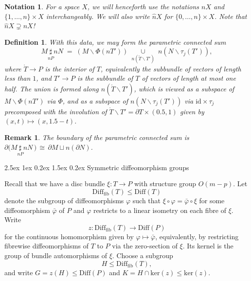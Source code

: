 \documentclass[reqno,a4paper]{article}
\makeatletter
\numberwithin{equation}{section}
\theoremstyle{italicised}
\theoremstyle{upright}
\newtheorem{defn}[thm]{Definition}
\newtheorem{rmk}[thm]{Remark}
\newtheorem{notation}[thm]{Notation}
\theoremstyle{italicised-restate}
\renewcommand*{\section}{\@startsection{section}{1}{\z@}%
	{2.5ex \@plus 1ex \@minus 0.2ex}%
	{1.5ex \@plus 0.2ex}%
	{\normalfont\large\bfseries}}
\renewcommand{\leq}{\leqslant}
\makeatother
\begin{document}
\begin{notation}
For a space $X$, we will henceforth use the notations $nX$ and $\{1,\ldots,n\} \times X$ interchangeably. We will also write $\hat{n} X$ for $\{ 0,\ldots,n \} \times X$. Note that $\hat{n}X \supsetneq nX$!
\end{notation}

\begin{defn}\label{d:param-conn-sum}
With this data, we may form the \emph{parametric connected sum}
\[
M \underset{nP}{\sharp} nN \;=\; (M \smallsetminus \Phi(nT')) \; \underset{n(\mathring{T} \smallsetminus T')}{\cup} \; n(N \smallsetminus \tau_j(T')),
\]
where $\mathring{T} \to P$ is the interior of $T$, equivalently the subbundle of vectors of length less than $1$, and $T' \to P$ is the subbundle of $T$ of vectors of length at most one half. The union is formed along $n(\mathring{T} \smallsetminus T')$, which is viewed as a subspace of $M \smallsetminus \Phi(nT')$ via $\Phi$, and as a subspace of $n(N \smallsetminus \tau_j(T'))$ via $\mathrm{id} \times \tau_j$ precomposed with the involution of $\mathring{T} \smallsetminus T' = \partial T \times (0.5,1)$ given by $(x,t) \mapsto (x,1.5-t)$.
\end{defn}

\begin{rmk}
The boundary of the parametric connected sum is $\partial \bigl( M \underset{nP}{\sharp} nN \, \bigr) \,\cong\, \partial M \sqcup n(\partial N)$.
\end{rmk}


\section{Symmetric diffeomorphism groups}\label{s:symm-diff-groups}


Recall that we have a disc bundle $\xi \colon T \to P$ with structure group $O(m-p)$. Let
\[
\mathrm{Diff}_{\mathrm{fib}}(T) \leq \mathrm{Diff}(T)
\]
denote the subgroup of diffeomorphisms $\varphi$ such that $\xi \circ \varphi = \bar{\varphi} \circ \xi$ for some diffeomorphism $\bar{\varphi}$ of $P$ and $\varphi$ restricts to a linear isometry on each fibre of $\xi$. Write 
\[
z \colon \mathrm{Diff}_{\mathrm{fib}}(T) \longrightarrow \mathrm{Diff}(P)
\]
for the continuous homomorphism given by $\varphi \mapsto \bar{\varphi}$, equivalently, by restricting fibrewise diffeomorphisms of $T$ to $P$ via the zero-section of $\xi$. Its kernel is the group of bundle automorphisms of $\xi$. Choose a subgroup
\[
H \leq \mathrm{Diff}_{\mathrm{fib}}(T),
\]
and write $G = z(H) \leq \mathrm{Diff}(P)$ and $K = H \cap \mathrm{ker}(z) \leq \mathrm{ker}(z)$.
\end{document}
